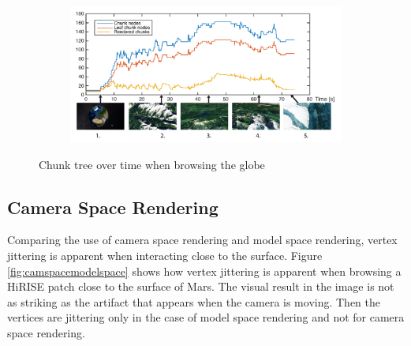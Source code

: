 \begin{figure}[h]
    \centering
    \begin{subfigure}[bt]{1.0\textwidth}
        \includegraphics[width=\textwidth]{figures/results/globebrowsing.pdf}
    \end{subfigure}
    \caption{Chunk tree over time when browsing the globe}
    \label{fig:interaction}
\end{figure}

\clearpage
\subsection{Camera Space Rendering}
\FloatBarrier

Comparing the use of camera space rendering and model space rendering, vertex jittering is apparent when interacting close to the surface. Figure \ref{fig:camspacemodelspace} shows how vertex jittering is apparent when browsing a HiRISE patch close to the surface of Mars. The visual result in the image is not as striking as the artifact that appears when the camera is moving. Then the vertices are jittering only in the case of model space rendering and not for camera space rendering. 

